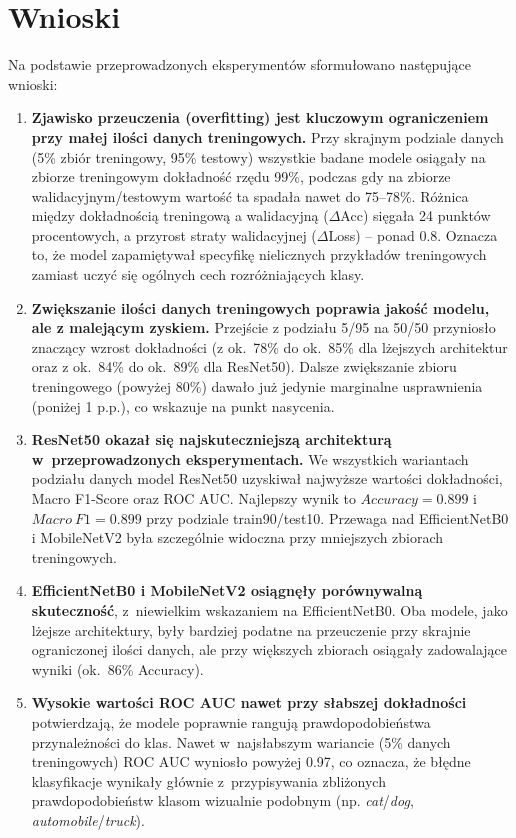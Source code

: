 \documentclass[12pt,a4paper]{article}
\begin{document}
\section{Wnioski}

Na podstawie przeprowadzonych eksperymentów sformułowano następujące wnioski:

\begin{enumerate}
    \item \textbf{Zjawisko przeuczenia (overfitting) jest kluczowym ograniczeniem przy małej ilości danych treningowych.} Przy skrajnym podziale danych (5\% zbiór treningowy, 95\% testowy) wszystkie badane modele osiągały na zbiorze treningowym dokładność rzędu 99\%, podczas gdy na zbiorze walidacyjnym/testowym wartość ta spadała nawet do 75--78\%. Różnica między dokładnością treningową a walidacyjną ($\Delta$Acc) sięgała 24 punktów procentowych, a przyrost straty walidacyjnej ($\Delta$Loss) -- ponad 0.8. Oznacza to, że model zapamiętywał specyfikę nielicznych przykładów treningowych zamiast uczyć się ogólnych cech rozróżniających klasy.

    \item \textbf{Zwiększanie ilości danych treningowych poprawia jakość modelu, ale z malejącym zyskiem.} Przejście z podziału 5/95 na 50/50 przyniosło znaczący wzrost dokładności (z ok.~78\% do ok.~85\% dla lżejszych architektur oraz z ok.~84\% do ok.~89\% dla ResNet50). Dalsze zwiększanie zbioru treningowego (powyżej 80\%) dawało już jedynie marginalne usprawnienia (poniżej 1 p.p.), co wskazuje na punkt nasycenia.

    \item \textbf{ResNet50 okazał się najskuteczniejszą architekturą w~przeprowadzonych eksperymentach.} We wszystkich wariantach podziału danych model ResNet50 uzyskiwał najwyższe wartości dokładności, Macro F1-Score oraz ROC AUC. Najlepszy wynik to $Accuracy = 0.899$ i $Macro\ F1 = 0.899$ przy podziale train90/test10. Przewaga nad EfficientNetB0 i MobileNetV2 była szczególnie widoczna przy mniejszych zbiorach treningowych.

    \item \textbf{EfficientNetB0 i MobileNetV2 osiągnęły porównywalną skuteczność}, z~niewielkim wskazaniem na EfficientNetB0. Oba modele, jako lżejsze architektury, były bardziej podatne na przeuczenie przy skrajnie ograniczonej ilości danych, ale przy większych zbiorach osiągały zadowalające wyniki (ok.~86\% Accuracy).

    \item \textbf{Wysokie wartości ROC AUC nawet przy słabszej dokładności} potwierdzają, że modele poprawnie rangują prawdopodobieństwa przynależności do klas. Nawet w~najsłabszym wariancie (5\% danych treningowych) ROC AUC wyniosło powyżej 0.97, co oznacza, że błędne klasyfikacje wynikały głównie z~przypisywania zbliżonych prawdopodobieństw klasom wizualnie podobnym (np. \textit{cat}/\textit{dog}, \textit{automobile}/\textit{truck}).


\end{enumerate}
\end{document}
